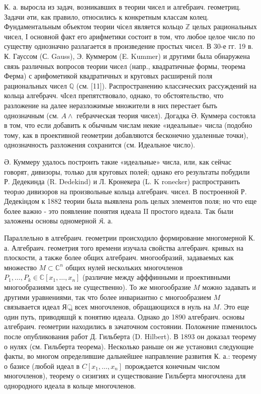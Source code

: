 \documentclass[10pt]{article}
\begin{document}
К. а. выросла из задач, возникавших в теории чисел и алгебраич. геометриц. Задачи әти, как правило, относились к конкретным классам колец. Фундаментальным объектом теории чісел является кольцо $\mathbb{Z}$ целых рациональных чисел, І основной факт его арифметики состоит в том, что любое целое число по существу однозначно разлагается в произведение простых чисел. В 30-е гг. 19 в. К. Гауссом (С. Gauss), Э. Куммером (E. Kummer) и другими была обнаружена связь различных вопросов теории чисел (напр., квадратичные формы, теорема Ферма) с арифометикой квадратичных и круговых расширенıй поля рациональных чисел $\mathbb{Q}$ (см. [11]). Распространению классических рассуждений на кольца алгебрачч. чІсел препятствовало, однако, то обстоятельство, что разложение на далее неразложимые множители в них перестает быть однозначным (см. $A \wedge$ гебрачческая теория чисел). Догадка Ә. Куммера состояла в том, что если добавить к обычным числам некие «идеальные» числа (подобно тому, как в проективной геометрии добавляются бесконечно удаленные точки), однозначность разложения сохранится (см. Идеальное число).



Ә. Куммеру удалось построить такие «идеальные» числа, или, как сейчас говорят, дивизоры, только для круговых полей; однако его результаты побудили Р. Дедекинда (R. Dedekind) и Л. Кронекера (L. K ronecker) распространить теорıю дивизоров на произвольные кольца алгебраич. чисел. В построенной Р. Дедекіндом к 1882 теории была выявлена роль целых элементов поля; но что еще более важно - это появление понятия идеала II простого идеала. Так были заложены основы одномерной $\mathfrak{K}$. а.



Параллельно в алгебраич. геометрии происходило формирование многомерной К. а. Алгебраич. геометрия того времени изучала свойства алгебраич. кривых на плоскости, а также более общих алгебраич. многообразий, задаваемых как множество $M \subset \mathbb{C}^{n}$ общих нулей нескольких многочленов $P_{1}, \ldots, P_{k} \in \mathbb{C}\left[x_{1}, \ldots, x_{n}\right]$ (различие между афффинными и проективными многообразиями здесь не существенно). То же многообразие $M$ можно задавать и другими уравнениями, так что более инвариантно с многообразием $M$ связывается идеал Я্র всех многочленов, обращающихся в нуль на $M$. Это еще один путь, приводяшцй к понятию идеала. Однако до 1890 алгебраич. основы алгебраич. геометрии находились в зачаточном состоянии. Положение пзменилось после опубликования работ Д. Гильберта (D. Hilbert). В 1893 он доказал теорему о нулях (см. Гильберта теорема). Несколько раньше он же установил следующие факты, во многом определившие дальнейшее направление развития К. а.: теорему о базисе (любой идеал в $C\left[x_{1}, \ldots, x_{n}\right]$ порождается конечным числом многочленов), теорему о сизигиях и существование Гильберта многочлена для однородного идеала в кольце многочленов.
\end{document}
